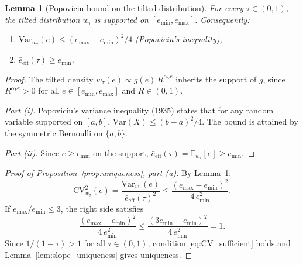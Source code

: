 \documentclass[12pt,a4paper]{article}
\theoremstyle{definition}
\theoremstyle{plain}
\newtheorem{lemma}{Lemma}[section]
\theoremstyle{remark}
\newcommand{\E}{\mathbb{E}}
\begin{document}

\begin{lemma}[Popoviciu bound on the tilted distribution]
\label{lem:popoviciu}
For every $\tau \in (0,1)$, the tilted distribution $w_\tau$
is supported on $[e_{\min}, e_{\max}]$.  Consequently:
\begin{enumerate}[label=(\roman*)]
\item $\mathrm{Var}_{w_\tau}(e)
       \leq (e_{\max} - e_{\min})^2/4$
       \quad (Popoviciu's inequality),
\item $\bar{e}_{\mathrm{eff}}(\tau) \geq e_{\min}$.
\end{enumerate}
\end{lemma}

\begin{proof}
The tilted density $w_\tau(e) \propto g(e)\,R^{\alpha_Y e}$
inherits the support of $g$, since $R^{\alpha_Y e} > 0$ for all
$e \in [e_{\min}, e_{\max}]$ and $R \in (0,1)$.

\emph{Part (i).}  Popoviciu's variance inequality (1935) states
that for any random variable supported on $[a,b]$,
$\mathrm{Var}(X) \leq (b-a)^2/4$.  The bound is attained by
the symmetric Bernoulli on $\{a, b\}$.

\emph{Part (ii).}  Since $e \geq e_{\min}$ on the support,
$\bar{e}_{\mathrm{eff}}(\tau) = \E_{w_\tau}[e] \geq e_{\min}$.
\end{proof}


\begin{proof}[Proof of Proposition~\ref{prop:uniqueness}, part (a)]
By Lemma~\ref{lem:popoviciu}:
\[
  \mathrm{CV}^2_{w_\tau}(e)
  = \frac{\mathrm{Var}_{w_\tau}(e)}{\bar{e}_{\mathrm{eff}}(\tau)^2}
  \leq \frac{(e_{\max} - e_{\min})^2}{4\,e_{\min}^2}.
\]
If $e_{\max}/e_{\min} \leq 3$, the right side satisfies
\[
  \frac{(e_{\max} - e_{\min})^2}{4\,e_{\min}^2}
  \leq \frac{(3e_{\min} - e_{\min})^2}{4\,e_{\min}^2}
  = 1.
\]
Since $1/(1-\tau) > 1$ for all $\tau \in (0,1)$, condition
\eqref{eq:CV_sufficient} holds and
Lemma~\ref{lem:slope_uniqueness} gives uniqueness.
\end{proof}

\end{document}
